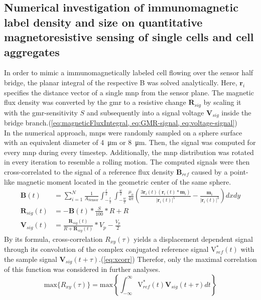 \subsection{Numerical investigation of immunomagnetic label density and size on quantitative magnetoresistive sensing of single cells and cell aggregates}
In order to mimic a immunomagnetically labeled cell flowing over the sensor half bridge, the planar integral of the respective \acrfull{B} was solved analytically. Here, $\mathbf{r}_i$ specifies the distance vector of a single \gls{mnp} from the sensor plane. The magnetic flux density was converted by the \gls{gmr} to a resistive change $\mathbf{R}_{sig}$ by scaling it with the \gls{gmr}-sensitivity $S$ and subsequently into a signal voltage $\mathbf{V}_{sig}$ inside the bridge branch.(\cref{eq:magneticFluxIntegral, eq:GMR-signal, eq:voltage-signal})\\
In the numerical approach, \glspl{mnp} were randomly sampled on a sphere surface with an equivalent diameter of \SI{4}{\micro\meter} or \SI{8}{\micro\meter}. Then, the signal was computed for every \gls{mnp} during every timestep. Additionally, the \gls{mnp} distribution was rotated in every iteration to resemble a rolling motion. The computed signals were then cross-correlated to the signal of a reference flux density $\mathbf{B}_{ref}$ caused by a point-like magnetic moment located in the geometric center of the same sphere.
\begin{align}
	\mathbf{B}(t) &= \sum_{i=1}^{N} \frac{1}{A_{\mathrm{Sensor}}} \int_{-\frac{l}{2}}^{\frac{l}{2}} \int_{-\frac{w}{2}}^{\frac{w}{2}} \frac{\mu_{o}}{4 \pi}\left(\frac{3 \mathbf{r}_{i}(t)\left(\mathbf{r}_{i}(t) * \mathbf{m}_{i}\right)}{\left|\mathbf{r}_{i}(t)\right|^{5}}-\frac{\mathbf{m}_{i}}{\left|\mathbf{r}_{i}(t)\right|^{3}}\right) dx dy \label{eq:magneticFluxIntegral} \\
	\mathbf{R}_{sig}(t) &= - \mathbf{B}(t) * \frac{S}{100} * R + R \label{eq:GMR-signal}\\
	\mathbf{V}_{sig}(t) &= \frac{\mathbf{R}_{sig}(t)}{R + \mathbf{R}_{sig}(t)}*V_p - \frac{V_p}{2} \label{eq:voltage-signal}
\end{align}
By its formula, cross-correlation $R_{x y}(\tau)$ yields a displacement dependent signal through its convolution of the complex conjugated reference signal $\mathrm{V}_{ref}^{*}(t)$ with the sample signal $\mathbf{V}_{sig}(t+\tau)$.(\cref{eq:xcorr}) Therefor, only the maximal correlation of this function was considered in further analyses.
\begin{equation}
	\mathrm{max}\{R_{x y}(\tau)\}=\mathrm{max}\left\{\int_{-\infty}^{\infty} \mathrm{V}_{ref}^{*}(t) \mathbf{V}_{sig}(t+\tau) dt \right\} \label{eq:xcorr}
\end{equation}

